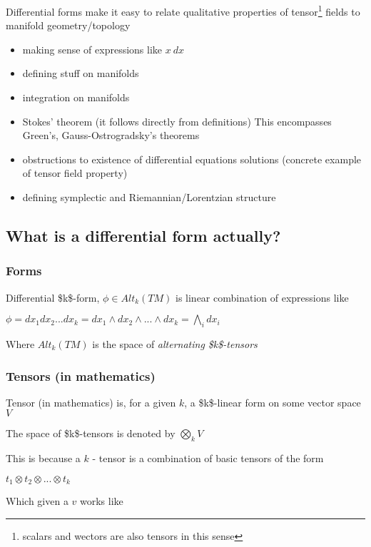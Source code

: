 \documentclass[11pt]{article}
\begin{document}
Differential forms make it easy to relate qualitative properties of tensor\footnote{scalars and wectors are also tensors in this sense} fields to manifold geometry/topology

\begin{itemize}
\item making sense of expressions like \(x\ dx\)
\item defining stuff on manifolds
\item integration on manifolds
\item Stokes' theorem (it follows directly from definitions)
This encompasses Green's, Gauss-Ostrogradsky's theorems
\item obstructions to existence of differential equations solutions (concrete example of tensor field property)
\item defining symplectic and Riemannian/Lorentzian structure
\end{itemize}


\subsection{What is a differential form actually?}
\label{sec:orga7d436c}

\subsubsection{Forms}
\label{sec:org847db67}
Differential \$k\$-form, \(\phi \in Alt_k(TM)\) is linear combination of expressions like

\(\phi = dx_1 dx_2 ... dx_k = dx_1 \wedge dx_2 \wedge ... \wedge dx_k = \bigwedge_i dx_i\)

Where \(Alt_k(TM)\) is the space of \emph{alternating \$k\$-tensors}

\subsubsection{Tensors (in mathematics)}
\label{sec:orgd87c1b2}

Tensor (in mathematics) is, for a given \(k\), a \$k\$-linear form on some vector space \(V\)

The space of \$k\$-tensors is denoted by \(\bigotimes_k V\)

This is because a \(k\) - tensor is a combination of basic tensors of the form

\(t_1 \otimes t_2 \otimes ... \otimes t_k\)

Which given a \(v\) works like
\end{document}
